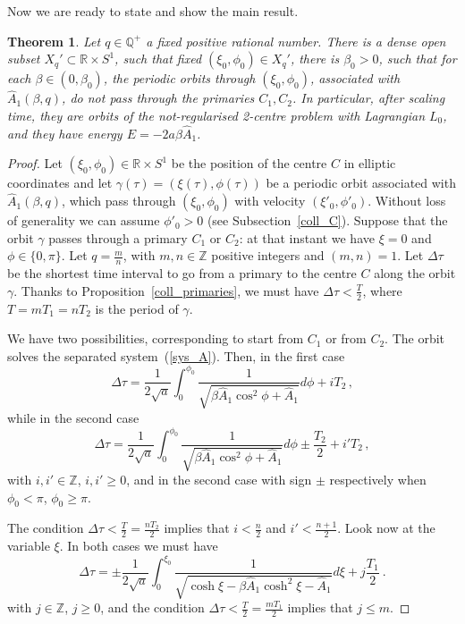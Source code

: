 \documentclass[a4paper]{article}
\newtheorem{theorem}{Theorem}
\begin{document}
Now we are ready to state and show the main result.
\begin{theorem}
\label{dense_C}
Let $q \in {\mathbb{Q}}^+$ a fixed positive rational number.  There is a dense
open subset $X_q'\subset {\mathbb{R}} \times S^1$, such that fixed
$(\xi_0,\phi_0) \in X_q'$, there is $\beta_0>0$, such that for each
$\beta \in (0,\beta_0)$, the periodic orbits through $(\xi_0,\phi_0)$,
associated with $\hat{A}_1(\beta,q)$, do not pass through the
primaries $C_1,C_2$. In particular, after scaling time, they are
orbits of the not-regularised 2-centre problem with Lagrangian $L_0$,
and they have energy $E=-2a \beta \hat{A}_1$.
\end{theorem}
\begin{proof}
Let $(\xi_0,\phi_0) \in {\mathbb{R}}\times S^1$ be the position of the centre
$C$ in elliptic coordinates and let
$\gamma(\tau)=(\xi(\tau),\phi(\tau))$ be a periodic orbit associated
with $\hat{A}_1(\beta,q)$, which pass through $(\xi_0,\phi_0)$ with
velocity $(\xi'_0,\phi'_0)$. Without loss of generality we can assume
$\phi'_0>0$ (see Subsection~\ref{coll_C}).  Suppose that the orbit
$\gamma$ passes through a primary $C_1$ or $C_2$: at that instant we
have $\xi=0$ and $\phi \in \{0,\pi\}$.  Let $q=\frac{m}{n}$, with
$m,n\in {\mathbb{Z}}$ positive integers and $(m,n)=1$.  Let $\Delta\tau$ be the
shortest time interval to go from a primary to the centre $C$ along the
orbit $\gamma$. Thanks to Proposition~\ref{coll_primaries}, we must
have $\Delta\tau < \frac{T}{2}$, where $T=mT_1=nT_2$ is the period of
$\gamma$.

We have two possibilities, corresponding to start from $C_1$ or from
$C_2$.  The orbit solves the separated system~(\ref{sys_A}). Then, in
the first case
\[
\Delta \tau = \frac{1}{2\sqrt{a}}\int_0^{\phi_0}
\frac{1}{\sqrt{\beta\hat{A}_1\cos^2\phi+\hat{A}_1}} d\phi + iT_2 \,,
\]
while in the second case
\[
\Delta \tau = \frac{1}{2\sqrt{a}}\int_0^{\phi_0}
\frac{1}{\sqrt{\beta\hat{A}_1\cos^2\phi+\hat{A}_1}} d\phi 
\pm \frac{T_2}{2}
+ i'T_2 
\,,
\]
with $i,i' \in {\mathbb{Z}}$, $i,i'\geq 0$, and in the second case with sign $\pm$
respectively when  $\phi_0<\pi$, $\phi_0\geq\pi$. 

The condition $\Delta \tau < \frac{T}{2}=\frac{nT_2}{2}$ implies that 
$i<\frac{n}{2}$ and $i'<\frac{n+1}{2}$. 
Look now at the variable $\xi$. In both cases we must have
\[
\Delta \tau = \pm \frac{1}{2\sqrt{a}} \int_0^{\xi_0}
\frac{1}{\sqrt{\cosh \xi - \beta \hat{A}_1 \cosh^2 \xi - \hat{A}_1}}d\xi 
+j\frac{T_1}{2}
\ .
\]
with $j \in {\mathbb{Z}}$, $j\geq 0$,
and the condition $\Delta \tau < \frac{T}{2}=\frac{mT_1}{2}$ implies 
that $j \leq m$.


\end{proof}
\end{document}
